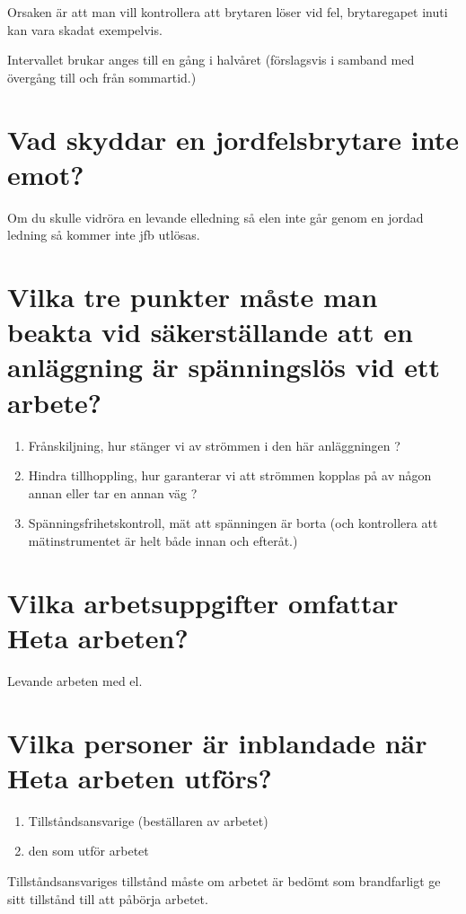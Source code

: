 \documentclass[a4paper,swedish]{article}
\begin{document}
Orsaken är att man vill kontrollera att brytaren löser vid fel, brytaregapet inuti kan vara skadat exempelvis.

Intervallet brukar anges till en gång i halvåret (förslagsvis i samband med övergång till och från sommartid.)

\section{Vad skyddar en jordfelsbrytare inte emot?}
\label{sec:q_37}

Om du skulle vidröra en levande elledning så elen inte går genom en jordad ledning så kommer inte jfb utlösas.

\section{Vilka tre punkter måste man beakta vid säkerställande att en anläggning är
  spänningslös vid ett arbete?}

\begin{enumerate}
\item Frånskiljning, hur stänger vi av strömmen i den här anläggningen ?
\item Hindra tillhoppling, hur garanterar vi att strömmen kopplas på av någon annan eller tar en annan väg ?
\item Spänningsfrihetskontroll, mät att spänningen är borta (och kontrollera att mätinstrumentet är helt både innan och efteråt.)
\end{enumerate}

\section{Vilka arbetsuppgifter omfattar Heta arbeten?}
\label{sec:q_39}

Levande arbeten med el.

\section{Vilka personer är inblandade när Heta arbeten utförs?}\label{sec:heta_arbeten_roller}

\begin{enumerate}
\item Tillståndsansvarige (beställaren av arbetet)
\item den som utför arbetet
\end{enumerate}

Tillståndsansvariges tillstånd måste om arbetet är bedömt som brandfarligt ge sitt tillstånd till att påbörja arbetet.
\end{document}
